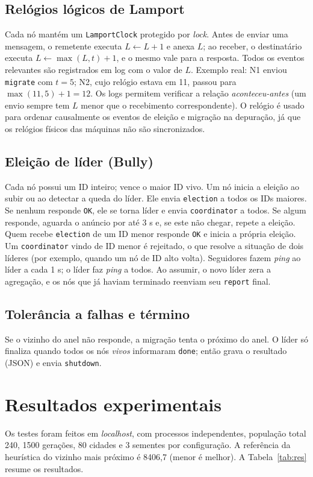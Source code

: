 \documentclass[12pt]{article}
\newcommand{\code}[1]{\texttt{\small #1}}
\begin{document}
\subsection{Relógios lógicos de Lamport}
Cada nó mantém um \code{LamportClock} protegido por \textit{lock}. Antes de enviar uma mensagem, o remetente executa $L \leftarrow L+1$ e anexa $L$; ao receber, o destinatário executa $L \leftarrow \max(L, t)+1$, e o mesmo vale para a resposta. Todos os eventos relevantes são registrados em log com o valor de $L$. Exemplo real: N1 enviou \code{migrate} com $t=5$; N2, cujo relógio estava em 11, passou para $\max(11,5)+1=12$. Os logs permitem verificar a relação \textit{aconteceu-antes} (um envio sempre tem $L$ menor que o recebimento correspondente). O relógio é usado para ordenar causalmente os eventos de eleição e migração na depuração, já que os relógios físicos das máquinas não são sincronizados.

\subsection{Eleição de líder (Bully)}
Cada nó possui um ID inteiro; vence o maior ID vivo. Um nó inicia a eleição ao subir ou ao detectar a queda do líder. Ele envia \code{election} a todos os IDs maiores. Se nenhum responde \code{OK}, ele se torna líder e envia \code{coordinator} a todos. Se algum responde, aguarda o anúncio por até 3 s e, se este não chegar, repete a eleição. Quem recebe \code{election} de um ID menor responde \code{OK} e inicia a própria eleição. Um \code{coordinator} vindo de ID menor é rejeitado, o que resolve a situação de dois líderes (por exemplo, quando um nó de ID alto volta). Seguidores fazem \textit{ping} ao líder a cada 1 s; o líder faz \textit{ping} a todos. Ao assumir, o novo líder zera a agregação, e os nós que já haviam terminado reenviam seu \code{report} final.

\subsection{Tolerância a falhas e término}
Se o vizinho do anel não responde, a migração tenta o próximo do anel. O líder só finaliza quando todos os nós \textit{vivos} informaram \code{done}; então grava o resultado (JSON) e envia \code{shutdown}.

\section{Resultados experimentais}
Os testes foram feitos em \textit{localhost}, com processos independentes, população total 240, 1500 gerações, 80 cidades e 3 sementes por configuração. A referência da heurística do vizinho mais próximo é 8406,7 (menor é melhor). A Tabela~\ref{tab:res} resume os resultados.
\end{document}
